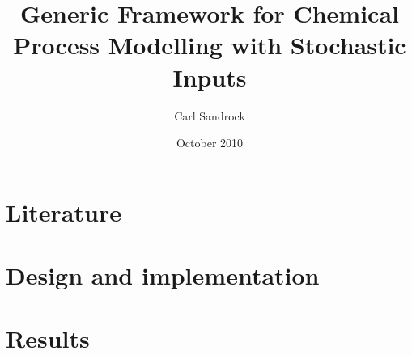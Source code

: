 \documentclass[a4paper, 12pt, %
pdftex]{report} %
\title{Generic Framework for Chemical Process Modelling with Stochastic Inputs}
\author{Carl Sandrock}
\date{October 2010}
\begin{document}



\pagestyle{headings}
\setcounter{page}{1}


\part{Literature}







\part{Design and implementation}


\part{Results}



\appendix
%
%
%
%


\end{document}
